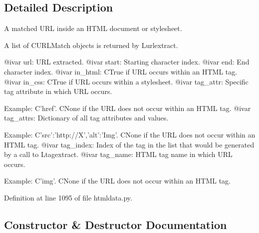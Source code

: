 \subsection{Detailed Description}
\begin{DoxyVerb}A matched URL inside an HTML document or stylesheet.

A list of C{URLMatch} objects is returned by L{urlextract}.

@ivar url:       URL extracted.
@ivar start:     Starting character index.
@ivar end:       End character index.
@ivar in_html:   C{True} if URL occurs within an HTML tag.
@ivar in_css:    C{True} if URL occurs within a stylesheet.
@ivar tag_attr:  Specific tag attribute in which URL occurs.

                 Example: C{'href'}.
                 C{None} if the URL does not occur within an HTML
                 tag.
@ivar tag_attrs: Dictionary of all tag attributes and values.

                 Example: C{{'src':'http://X','alt':'Img'}}.
                 C{None} if the URL does not occur within an HTML
                 tag.
@ivar tag_index: Index of the tag in the list that would be
                 generated by a call to L{tagextract}.
@ivar tag_name:  HTML tag name in which URL occurs.

                 Example: C{'img'}.
                 C{None} if the URL does not occur within an HTML
                 tag.\end{DoxyVerb}
 

Definition at line 1095 of file htmldata.\+py.



\subsection{Constructor \& Destructor Documentation}
